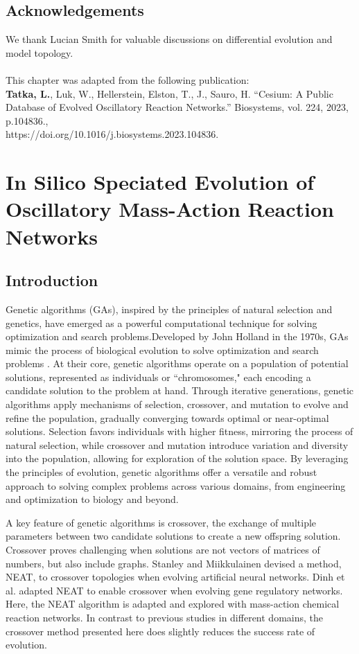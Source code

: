 \documentclass[12pt]{report}
\begin{document}
\section*{Acknowledgements}
We thank Lucian Smith for valuable discussions on differential evolution and model topology. 
\\
\\
This chapter was adapted from the following publication:
\\
\textbf{Tatka, L.}, Luk, W., Hellerstein, Elston, T., J., Sauro, H. “Cesium: A Public Database of Evolved Oscillatory Reaction Networks.”  Biosystems, vol. 224, 2023, p.104836., \\
https://doi.org/10.1016/j.biosystems.2023.104836. 
\\


\chapter{In Silico Speciated Evolution of Oscillatory Mass-Action Reaction Networks}
\label{chap: NetEvolve}
\section{Introduction}
Genetic algorithms (GAs), inspired by the principles of natural selection and genetics, have emerged as a powerful computational technique for solving optimization and search problems.Developed by John Holland in the 1970s, GAs mimic the process of biological evolution to solve optimization and search problems \cite{holland_1975}. At their core, genetic algorithms operate on a population of potential solutions, represented as individuals or ``chromosomes," each encoding a candidate solution to the problem at hand. Through iterative generations, genetic algorithms apply mechanisms of selection, crossover, and mutation to evolve and refine the population, gradually converging towards optimal or near-optimal solutions. Selection favors individuals with higher fitness, mirroring the process of natural selection, while crossover and mutation introduce variation and diversity into the population, allowing for exploration of the solution space. By leveraging the principles of evolution, genetic algorithms offer a versatile and robust approach to solving complex problems across various domains, from engineering and optimization to biology and beyond.

A key feature of genetic algorithms is crossover, the exchange of multiple parameters between two candidate solutions to create a new offspring solution. Crossover proves challenging when solutions are not vectors of matrices of numbers, but also include graphs. Stanley and  Miikkulainen devised a method, NEAT, to crossover topologies when evolving artificial neural networks. Dinh et al. adapted NEAT to enable crossover when evolving gene regulatory networks. Here, the NEAT algorithm is adapted and explored with mass-action chemical reaction networks. In contrast to previous studies in different domains, the crossover method presented here does slightly reduces the success rate of evolution. 
\end{document}
